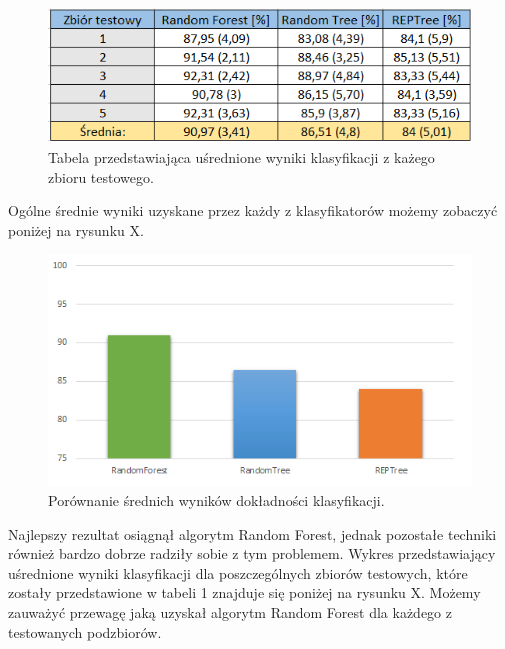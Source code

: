 \documentclass[conference]{IEEEtran}
\begin{document}
\begin{figure}[htbp]
\centerline{\includegraphics[scale=0.75]{pic/glowna_tabela.png}}
\caption{Tabela przedstawiająca uśrednione wyniki klasyfikacji z każego zbioru testowego.}
\label{drzewo_decyzyjne}
\end{figure}

Ogólne średnie wyniki uzyskane przez każdy z klasyfikatorów możemy zobaczyć poniżej na rysunku X.

\begin{figure}[htbp]
\centerline{\includegraphics[scale=0.8]{pic/accuracy.png}}
\caption{Porównanie średnich wyników dokładności klasyfikacji.}
\label{drzewo_decyzyjne}
\end{figure}

Najlepszy rezultat osiągnął algorytm Random Forest, jednak pozostałe techniki również bardzo dobrze radziły sobie z tym problemem. Wykres przedstawiający uśrednione wyniki klasyfikacji dla poszczególnych zbiorów testowych, które zostały przedstawione w tabeli 1 znajduje się poniżej na rysunku X. Możemy zauważyć przewagę jaką uzyskał algorytm Random Forest dla każdego z testowanych podzbiorów. 
\end{document}

